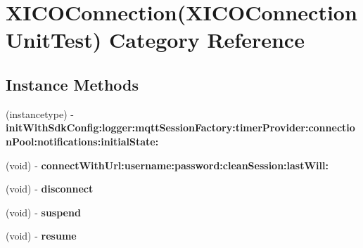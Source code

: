 \hypertarget{category_x_i_c_o_connection_07_x_i_c_o_connection_unit_test_08}{}\section{X\+I\+C\+O\+Connection(X\+I\+C\+O\+Connection\+Unit\+Test) Category Reference}
\label{category_x_i_c_o_connection_07_x_i_c_o_connection_unit_test_08}
\subsection*{Instance Methods}
\begin{DoxyCompactItemize}
\item 
\hypertarget{category_x_i_c_o_connection_07_x_i_c_o_connection_unit_test_08_a5a3dde4eac21ebd9e163b8c00097ccbe}{}\label{category_x_i_c_o_connection_07_x_i_c_o_connection_unit_test_08_a5a3dde4eac21ebd9e163b8c00097ccbe} 
(instancetype) -\/ {\bfseries init\+With\+Sdk\+Config\+:logger\+:mqtt\+Session\+Factory\+:timer\+Provider\+:connection\+Pool\+:notifications\+:initial\+State\+:}
\item 
\hypertarget{category_x_i_c_o_connection_07_x_i_c_o_connection_unit_test_08_adff2825e74a709c7a728851cb11103eb}{}\label{category_x_i_c_o_connection_07_x_i_c_o_connection_unit_test_08_adff2825e74a709c7a728851cb11103eb} 
(void) -\/ {\bfseries connect\+With\+Url\+:username\+:password\+:clean\+Session\+:last\+Will\+:}
\item 
\hypertarget{category_x_i_c_o_connection_07_x_i_c_o_connection_unit_test_08_ab0f776be6cbc9765228b7fa487409c3f}{}\label{category_x_i_c_o_connection_07_x_i_c_o_connection_unit_test_08_ab0f776be6cbc9765228b7fa487409c3f} 
(void) -\/ {\bfseries disconnect}
\item 
\hypertarget{category_x_i_c_o_connection_07_x_i_c_o_connection_unit_test_08_a1c64b7c52a3cf6fa1b4a6f352c0d89f3}{}\label{category_x_i_c_o_connection_07_x_i_c_o_connection_unit_test_08_a1c64b7c52a3cf6fa1b4a6f352c0d89f3} 
(void) -\/ {\bfseries suspend}
\item 
\hypertarget{category_x_i_c_o_connection_07_x_i_c_o_connection_unit_test_08_a8c5d5641a154e40eccac6f6283d9e9b7}{}\label{category_x_i_c_o_connection_07_x_i_c_o_connection_unit_test_08_a8c5d5641a154e40eccac6f6283d9e9b7} 
(void) -\/ {\bfseries resume}
\item 
\hypertarget{category_x_i_c_o_connection_07_x_i_c_o_connection_unit_test_08_af587b6758bac178a3f0230b56cc0dc20}{}\label{category_x_i_c_o_connection_07_x_i_c_o_connection_unit_test_08_af587b6758bac178a3f0230b56cc0dc20} 

\end{DoxyCompactItemize}
